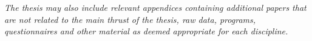 
\emph{The thesis may also include relevant appendices containing additional papers that are not related to the main thrust of the thesis, raw data, programs, questionnaires and other material as deemed appropriate for each discipline.}